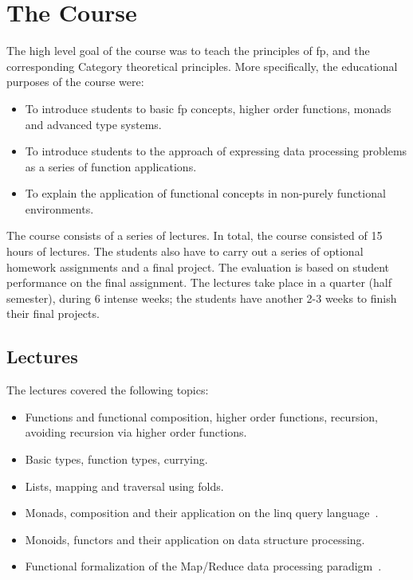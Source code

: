 \documentclass[conference]{sig-alternate}
\begin{document}
\section{The Course}

The high level goal of the course was to teach the principles of {\sc fp}, and the corresponding Category theoretical principles. More specifically, the educational purposes of the course were:

\begin{itemize}

  \item To introduce students to basic {\sc fp} concepts,
    higher order functions, monads and advanced type systems.

  \item To introduce students to the approach of expressing data processing
    problems as a series of function applications.

  \item To explain the application of functional concepts in non-purely
    functional environments.

\end{itemize}

The course consists of a series of lectures. In total, the
course consisted of 15 hours of lectures. 
The students
also have to carry out a series of optional homework assignments and a final project.
The evaluation is based on student performance on the final assignment. 
The lectures take place in a quarter (half semester), during 6 intense 
weeks; the students have another 2-3 weeks to finish their final projects.

\subsection{Lectures}

The lectures covered the following topics:

\begin{itemize}

  \item Functions and functional composition, higher order functions, recursion, 
    avoiding recursion via higher order functions.

  \item Basic types, function types, currying.

  \item Lists, mapping and traversal using folds.

  \item Monads, composition and their application on the {\sc linq} query 
    language~\cite{Meije11}.

  \item Monoids, functors and their application on data structure processing.

  \item Functional formalization of the Map/Reduce data processing
    paradigm~\cite{Lamme08}.

\end{itemize}
\end{document}
